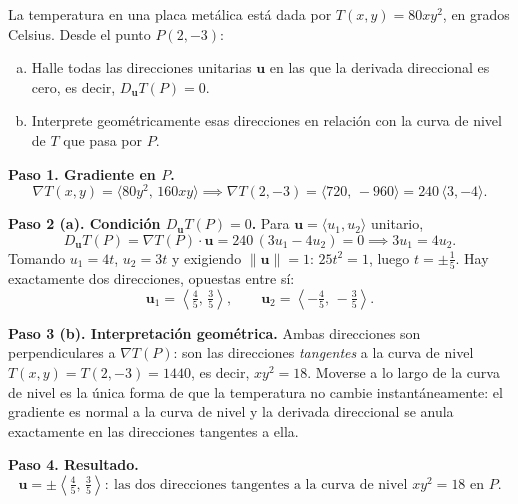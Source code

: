 \begin{prob}
La temperatura en una placa metálica está dada por $T(x,y)=80xy^2$, en grados Celsius. Desde el punto $P(2,-3)$:
\begin{enumerate}[a)]
    \item Halle todas las direcciones unitarias $\mathbf{u}$ en las que la derivada direccional es cero, es decir, $D_{\mathbf{u}}T(P)=0$.
    \item Interprete geométricamente esas direcciones en relación con la curva de nivel de $T$ que pasa por $P$.
\end{enumerate}
\begin{myproof}
\textbf{Paso 1. Gradiente en $P$.}
\[
\nabla T(x,y)=\langle 80y^2,\,160xy\rangle
\implies \nabla T(2,-3)=\langle 720,\,-960\rangle=240\,\langle 3,-4\rangle.
\]

\textbf{Paso 2 (a). Condición $D_{\mathbf{u}}T(P)=0$.}
Para $\mathbf{u}=\langle u_1,u_2\rangle$ unitario,
\[
D_{\mathbf{u}}T(P)=\nabla T(P)\cdot\mathbf{u}
=240\,(3u_1-4u_2)=0
\implies 3u_1=4u_2.
\]
Tomando $u_1=4t$, $u_2=3t$ y exigiendo $\|\mathbf{u}\|=1$: $25t^2=1$, luego $t=\pm\tfrac{1}{5}$. Hay exactamente dos direcciones, opuestas entre sí:
\[
\mathbf{u}_1=\left\langle \tfrac{4}{5},\,\tfrac{3}{5}\right\rangle,\qquad
\mathbf{u}_2=\left\langle -\tfrac{4}{5},\,-\tfrac{3}{5}\right\rangle.
\]

\textbf{Paso 3 (b). Interpretación geométrica.}
Ambas direcciones son perpendiculares a $\nabla T(P)$: son las direcciones \emph{tangentes} a la curva de nivel $T(x,y)=T(2,-3)=1440$, es decir, $xy^2=18$. Moverse a lo largo de la curva de nivel es la única forma de que la temperatura no cambie instantáneamente: el gradiente es normal a la curva de nivel y la derivada direccional se anula exactamente en las direcciones tangentes a ella.

\textbf{Paso 4. Resultado.}
\[
\boxed{\mathbf{u}=\pm\left\langle \tfrac{4}{5},\,\tfrac{3}{5}\right\rangle:\ \text{las dos direcciones tangentes a la curva de nivel }xy^2=18\text{ en }P.}
\]
\end{myproof}
\end{prob}

